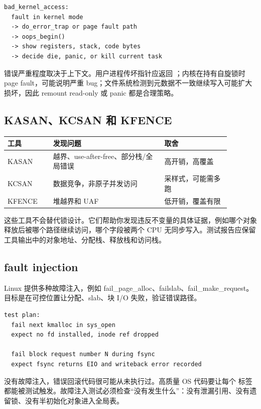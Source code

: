 \begin{lstlisting}
bad_kernel_access:
  fault in kernel mode
  -> do_error_trap or page fault path
  -> oops_begin()
  -> show registers, stack, code bytes
  -> decide die, panic, or kill current task
\end{lstlisting}

错误严重程度取决于上下文。用户进程传坏指针应返回 ；内核在持有自旋锁时 page fault，可能说明严重 bug；文件系统检测到元数据不一致继续写入可能扩大损坏，因此 remount read-only 或 panic 都是合理策略。

\subsection{KASAN、KCSAN 和 KFENCE}

\begin{longtable}{|L{0.18\linewidth}|L{0.44\linewidth}|L{0.26\linewidth}|}
\toprule
工具 & 发现问题 & 取舍 \\
\midrule
KASAN & 越界、use-after-free、部分栈/全局错误 & 高开销，高覆盖 \\\tablerowrule
KCSAN & 数据竞争，非原子并发访问 & 采样式，可能需多跑 \\\tablerowrule
KFENCE & 堆越界和 UAF & 低开销，覆盖有限 \\
\bottomrule
\end{longtable}

这些工具不会替代锁设计。它们帮助你发现违反不变量的具体证据，例如哪个对象释放后被哪个路径继续访问，哪个字段被两个 CPU 无同步写入。测试报告应保留工具输出中的对象地址、分配栈、释放栈和访问栈。

\subsection{fault injection}

Linux 提供多种故障注入，例如 fail\_page\_alloc、failslab、fail\_make\_request。目标是在可控位置让分配、slab、块 I/O 失败，验证错误路径。

\begin{lstlisting}
test plan:
  fail next kmalloc in sys_open
  expect no fd installed, inode ref dropped

  fail block request number N during fsync
  expect fsync returns EIO and writeback error recorded
\end{lstlisting}

没有故障注入，错误回滚代码很可能从未执行过。高质量 OS 代码要让每个  标签都能被测试触发。故障注入测试必须检查“没有发生什么”：没有泄漏引用、没有遗留锁、没有半初始化对象进入全局表。

